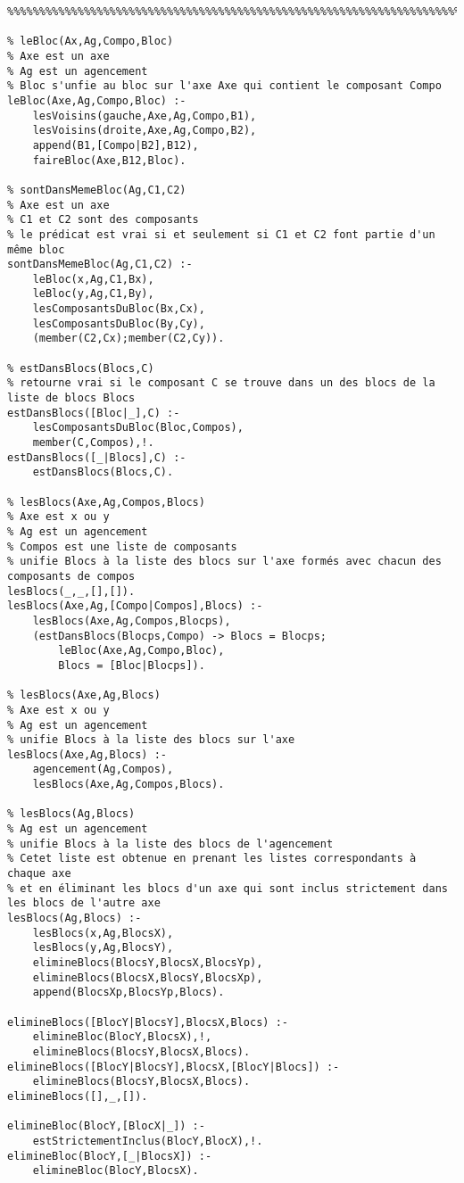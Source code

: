 \documentclass[letterpaper,11pt]{letter}
\begin{document}
\begin{verbatim}
%%%%%%%%%%%%%%%%%%%%%%%%%%%%%%%%%%%%%%%%%%%%%%%%%%%%%%%%%%%%%%%%%%%%%%%%%%%%%%%%

% leBloc(Ax,Ag,Compo,Bloc)
% Axe est un axe
% Ag est un agencement
% Bloc s'unfie au bloc sur l'axe Axe qui contient le composant Compo
leBloc(Axe,Ag,Compo,Bloc) :-
	lesVoisins(gauche,Axe,Ag,Compo,B1),
	lesVoisins(droite,Axe,Ag,Compo,B2),
	append(B1,[Compo|B2],B12),
	faireBloc(Axe,B12,Bloc).

% sontDansMemeBloc(Ag,C1,C2)
% Axe est un axe
% C1 et C2 sont des composants
% le prédicat est vrai si et seulement si C1 et C2 font partie d'un même bloc
sontDansMemeBloc(Ag,C1,C2) :-
	leBloc(x,Ag,C1,Bx),
	leBloc(y,Ag,C1,By),
	lesComposantsDuBloc(Bx,Cx),
	lesComposantsDuBloc(By,Cy),
	(member(C2,Cx);member(C2,Cy)).

% estDansBlocs(Blocs,C) 
% retourne vrai si le composant C se trouve dans un des blocs de la liste de blocs Blocs
estDansBlocs([Bloc|_],C) :-
	lesComposantsDuBloc(Bloc,Compos),
	member(C,Compos),!.
estDansBlocs([_|Blocs],C) :-
	estDansBlocs(Blocs,C).

% lesBlocs(Axe,Ag,Compos,Blocs)
% Axe est x ou y
% Ag est un agencement
% Compos est une liste de composants
% unifie Blocs à la liste des blocs sur l'axe formés avec chacun des composants de compos
lesBlocs(_,_,[],[]).
lesBlocs(Axe,Ag,[Compo|Compos],Blocs) :-
	lesBlocs(Axe,Ag,Compos,Blocps),
	(estDansBlocs(Blocps,Compo) -> Blocs = Blocps;
	    leBloc(Axe,Ag,Compo,Bloc),
	    Blocs = [Bloc|Blocps]).

% lesBlocs(Axe,Ag,Blocs)
% Axe est x ou y
% Ag est un agencement
% unifie Blocs à la liste des blocs sur l'axe
lesBlocs(Axe,Ag,Blocs) :-
	agencement(Ag,Compos),
	lesBlocs(Axe,Ag,Compos,Blocs).

% lesBlocs(Ag,Blocs)
% Ag est un agencement
% unifie Blocs à la liste des blocs de l'agencement
% Cetet liste est obtenue en prenant les listes correspondants à chaque axe
% et en éliminant les blocs d'un axe qui sont inclus strictement dans les blocs de l'autre axe
lesBlocs(Ag,Blocs) :-
	lesBlocs(x,Ag,BlocsX),
	lesBlocs(y,Ag,BlocsY),
	elimineBlocs(BlocsY,BlocsX,BlocsYp),
	elimineBlocs(BlocsX,BlocsY,BlocsXp),
	append(BlocsXp,BlocsYp,Blocs).

elimineBlocs([BlocY|BlocsY],BlocsX,Blocs) :-
	elimineBloc(BlocY,BlocsX),!,
	elimineBlocs(BlocsY,BlocsX,Blocs).
elimineBlocs([BlocY|BlocsY],BlocsX,[BlocY|Blocs]) :-
	elimineBlocs(BlocsY,BlocsX,Blocs).
elimineBlocs([],_,[]).

elimineBloc(BlocY,[BlocX|_]) :-
	estStrictementInclus(BlocY,BlocX),!.
elimineBloc(BlocY,[_|BlocsX]) :-
	elimineBloc(BlocY,BlocsX).


\end{verbatim}
\end{document}
